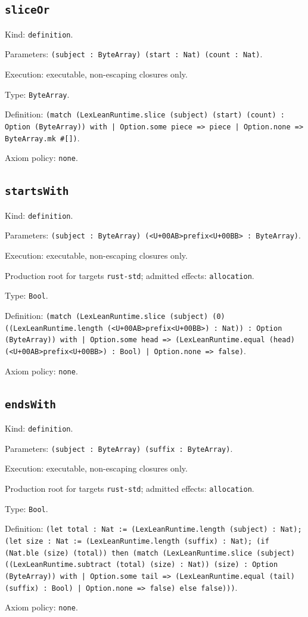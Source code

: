 \documentclass[11pt]{article}
\begin{document}
\subsection*{\texttt{sliceOr}}
\noindent Kind: \texttt{definition}.\par
\noindent Parameters: \texttt{(subject : ByteArray) (start : Nat) (count : Nat)}.\par
\noindent Execution: executable, non-escaping closures only.\par
\noindent Type: \texttt{ByteArray}.\par
\noindent Definition: \texttt{(match (LexLeanRuntime.slice (subject) (start) (count) : Option (ByteArray)) with | Option.some piece => piece | Option.none => ByteArray.mk \#[])}.\par
\noindent Axiom policy: \texttt{none}.\par
\subsection*{\texttt{startsWith}}
\noindent Kind: \texttt{definition}.\par
\noindent Parameters: \texttt{(subject : ByteArray) (<U+00AB>prefix<U+00BB> : ByteArray)}.\par
\noindent Execution: executable, non-escaping closures only.\par
\noindent Production root for targets \texttt{rust-std}; admitted effects: \texttt{allocation}.\par
\noindent Type: \texttt{Bool}.\par
\noindent Definition: \texttt{(match (LexLeanRuntime.slice (subject) (0) ((LexLeanRuntime.length (<U+00AB>prefix<U+00BB>) : Nat)) : Option (ByteArray)) with | Option.some head => (LexLeanRuntime.equal (head) (<U+00AB>prefix<U+00BB>) : Bool) | Option.none => false)}.\par
\noindent Axiom policy: \texttt{none}.\par
\subsection*{\texttt{endsWith}}
\noindent Kind: \texttt{definition}.\par
\noindent Parameters: \texttt{(subject : ByteArray) (suffix : ByteArray)}.\par
\noindent Execution: executable, non-escaping closures only.\par
\noindent Production root for targets \texttt{rust-std}; admitted effects: \texttt{allocation}.\par
\noindent Type: \texttt{Bool}.\par
\noindent Definition: \texttt{(let total : Nat := (LexLeanRuntime.length (subject) : Nat); (let size : Nat := (LexLeanRuntime.length (suffix) : Nat); (if (Nat.ble (size) (total)) then (match (LexLeanRuntime.slice (subject) ((LexLeanRuntime.subtract (total) (size) : Nat)) (size) : Option (ByteArray)) with | Option.some tail => (LexLeanRuntime.equal (tail) (suffix) : Bool) | Option.none => false) else false)))}.\par
\noindent Axiom policy: \texttt{none}.\par
\end{document}
